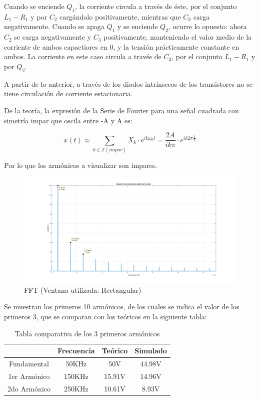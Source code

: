 \documentclass[e4_tp3_main.tex]{subfiles}
\begin{document}
Cuando se enciende $Q_1$, la corriente circula a través de éste, por el conjunto $L_1 - R_1$ y por $C_2$ cargándolo positivamente, mientras que $C_3$ carga negativamente. Cuando se apaga $Q_1$ y se enciende $Q_2$, ocurre lo opuesto: ahora $C_2$ se carga negativamente y $C_3$ positivamente, manteniendo el valor medio de la corriente de ambos capactiores en 0, y la tensión prácticamente constante en ambos. La corriente en este caso circula a través de $C_3$, por el conjunto $L_1 - R_1$ y por $Q_2$.\par
A partir de lo anterior, a través de los diodos intrínsecos de los transistores no se tiene circulación de corriente estacionaria.

De la teoría, la expresión de la Serie de Fourier para una señal cuadrada con simetría impar que oscila entre -A y A es:

\[
x(t) \approx \sum_{k \in \mathbb Z (impar)}^{}X_k \cdot e^{ik\omega_0 t} = \frac{2A}{ik\pi} \cdot e^{ik2\pi \frac{t}{T}} 
\]

Por lo que los armónicos a visualizar son impares.

\begin{figure}[H]
\centering
\includegraphics[width=1\linewidth]{Imagenes/fft.png}
\caption{FFT (Ventana utilizada: Rectangular)}
\end{figure}

Se muestran los primeros 10 armónicos, de los cuales se indica el valor de los primeros 3, que se comparan con los teóricos en la siguiente tabla:

\begin{table}[ht]
\centering
\begin{tabular}{|c|c|c|c|}
\hline
             & Frecuencia & Teórico & Simulado \\ \hline
Fundamental  & 50KHz      & 50V     & 44.98V   \\ \hline
1er Armónico & 150KHz     & 15.91V  & 14.96V   \\ \hline
2do Armónico & 250KHz     & 10.61V  & 8.93V    \\ \hline
\end{tabular}
\caption{Tabla comparativa de los 3 primeros armónicos}
\end{table}
\end{document}
